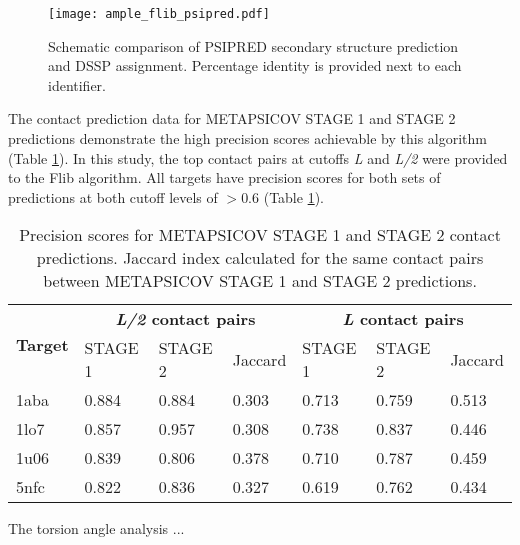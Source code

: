 \begin{figure}[H]
	\centering
	\texttt{[image: ample\_flib\_psipred.pdf]}
	\caption{Schematic comparison of PSIPRED \cite{Jones1999-fi} secondary structure prediction and DSSP \cite{Frishman1995-ns} assignment. Percentage identity is provided next to each identifier.}
	\label{fig:ample_flib_psipred}
\end{figure}

The contact prediction data for METAPSICOV STAGE 1 and STAGE 2 predictions demonstrate the high precision scores achievable by this algorithm (Table \ref{table:ample_flib_contact_precision}). In this study, the top contact pairs at cutoffs \textit{L} and \textit{L/2} were provided to the Flib algorithm. All targets have precision scores for both sets of predictions at both cutoff levels of $>0.6$ (Table \ref{table:ample_flib_contact_precision}).

\begin{table}[H]
  \centering
  \begin{tabularx}{\textwidth}{|X|X|X|X|X|X|X|}
      \hline
	  \multirow{2}{*}{\textbf{Target}} & \multicolumn{3}{c|}{\textbf{\textit{L/2} contact pairs}} & \multicolumn{3}{c|}{\textbf{\textit{L} contact pairs}} 				\\ \cline{2-7}
	  							&  	STAGE 1	& 	STAGE 2	& 	Jaccard 	& 	STAGE 1 	& 	STAGE 2 	& 	Jaccard	 	\\ \hline
	  1aba						&	0.884	&	0.884	&	0.303	&	0.713	&	0.759	&	0.513		\\ \hline
	  1lo7						&	0.857	&	0.957	&	0.308	&	0.738	&	0.837	&	0.446		\\ \hline
	  1u06						&	0.839	&	0.806	&	0.378	&	0.710	&	0.787	&	0.459		\\ \hline
	  5nfc						&	0.822	&	0.836	&	0.327	&	0.619	&	0.762	&	0.434		\\ \hline
  \end{tabularx}
  \caption[Contact prediction summary for Flib targets]{Precision scores for METAPSICOV \cite{Jones2015-wp} STAGE 1 and STAGE 2 contact predictions. Jaccard index calculated for the same contact pairs between METAPSICOV STAGE 1 and STAGE 2 predictions.}
  \label{table:ample_flib_contact_precision}
\end{table}

The torsion angle analysis ...





